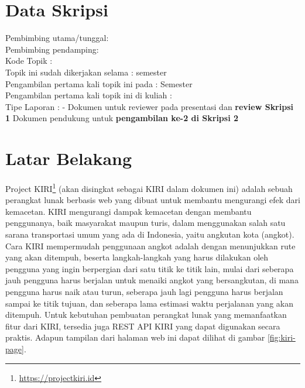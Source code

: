 \documentclass[a4paper,twoside]{article}
\begin{document}

\section{Data Skripsi} %
Pembimbing utama/tunggal: {\bf \pembA}\\
Pembimbing pendamping: {\bf \pembB}\\
Kode Topik : {\bf \kodetopik}\\
Topik ini sudah dikerjakan selama : {\bf \lamaSkripsi} semester\\
Pengambilan pertama kali topik ini pada : Semester {\bf \semesterPertama} \\
Pengambilan pertama kali topik ini di kuliah : {\bf \kulPertama} \\
Tipe Laporan : {\bf \tipePR} -
		{
		 {
				Dokumen untuk reviewer pada presentasi dan {\bf review Skripsi 1}}
			{	Dokumen pendukung untuk {\bf pengambilan ke-2 di Skripsi 2}}
		}
		
\section{Latar Belakang}
\label{sec:label}
Project KIRI\footnote{\href{https://projectkiri.id}{https://projectkiri.id}} (akan disingkat sebagai KIRI dalam dokumen ini) adalah sebuah perangkat lunak berbasis web yang dibuat untuk \mbox{membantu} mengurangi efek dari kemacetan. KIRI mengurangi dampak kemacetan dengan membantu penggunanya, baik \mbox{masyarakat} maupun turis, dalam menggunakan salah satu sarana transportasi umum yang ada di Indonesia, yaitu angkutan kota (angkot). Cara KIRI \mbox{mempermudah} penggunaan angkot adalah dengan menunjukkan rute yang akan ditempuh, beserta langkah-langkah yang harus dilakukan oleh pengguna yang ingin berpergian dari satu titik ke titik lain, mulai dari seberapa jauh pengguna harus berjalan untuk menaiki angkot yang bersangkutan, di mana pengguna harus naik atau turun, seberapa jauh lagi pengguna harus berjalan sampai ke titik tujuan, dan seberapa lama estimasi waktu perjalanan yang akan ditempuh. Untuk kebutuhan pembuatan perangkat lunak yang memanfaatkan fitur dari KIRI, tersedia juga REST API KIRI yang dapat digunakan secara praktis. Adapun tampilan dari halaman web ini dapat dilihat di gambar \ref{fig:kiri-page}. 
\end{document}
